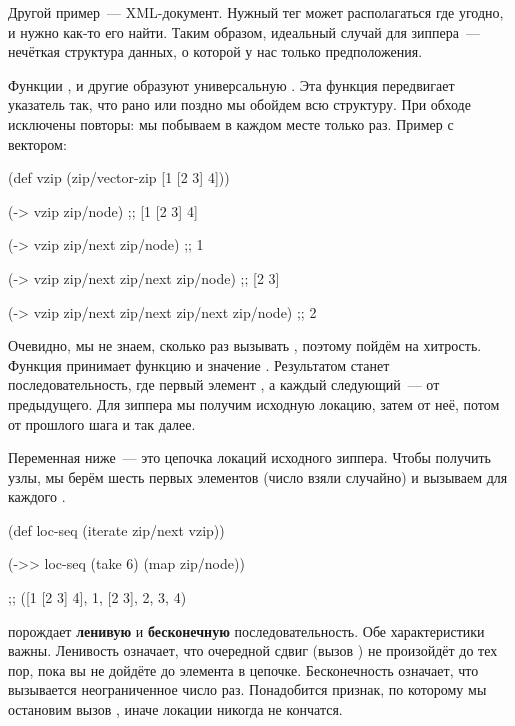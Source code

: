 Другой пример~--- XML-документ. Нужный тег может располагаться где угодно, и
нужно как-то его найти. Таким образом, идеальный случай для зиппера~--- нечёткая
структура данных, о которой у нас только предположения.


Функции ,  и другие образуют универсальную . Эта
функция передвигает указатель так, что рано или поздно мы обойдем всю
структуру. При обходе исключены повторы: мы побываем в каждом месте только
раз. Пример с вектором:

\begin{english}
  \begin{clojure}
(def vzip
  (zip/vector-zip [1 [2 3] 4]))

(-> vzip zip/node)
;; [1 [2 3] 4]

(-> vzip zip/next zip/node)
;; 1

(-> vzip zip/next zip/next zip/node)
;; [2 3]

(-> vzip zip/next zip/next zip/next zip/node)
;; 2
  \end{clojure}
\end{english}

Очевидно, мы не знаем, сколько раз вызывать , поэтому пойдём на
хитрость. Функция  принимает функцию  и значение . Результатом
станет последовательность, где первый элемент , а каждый следующий~--- 
от предыдущего. Для зиппера мы получим исходную локацию, затем  от
неё, потом  от прошлого шага и так далее.

Переменная  ниже~--- это цепочка локаций исходного зиппера. Чтобы
получить узлы, мы берём шесть первых элементов (число взяли случайно) и вызываем
для каждого .

\begin{english}
  \begin{clojure}
(def loc-seq
  (iterate zip/next vzip))

(->> loc-seq
     (take 6)
     (map zip/node))

;; ([1 [2 3] 4], 1, [2 3], 2, 3, 4)
  \end{clojure}
\end{english}

 порождает \textbf{ленивую} и \textbf{бесконечную}
последовательность. Обе характеристики важны. Ленивость означает, что очередной
сдвиг (вызов ) не произойдёт до тех пор, пока вы не дойдёте до
элемента в цепочке. Бесконечность означает, что  вызывается
неограниченное число раз. Понадобится признак, по которому мы остановим вызов
, иначе локации никогда не кончатся.

